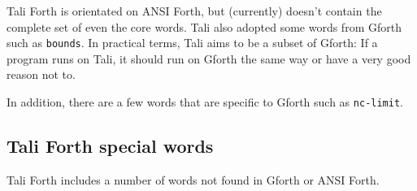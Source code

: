 Tali Forth is orientated on ANSI Forth, but (currently) doesn't contain the
complete set of even the core words. Tali also adopted some words from
Gforth such as \texttt{bounds}. In
practical terms, Tali aims to be a subset of Gforth: If a program runs on Tali,
it should run on Gforth the same way or have a very good reason not to. 

In addition, there are a few words that are specific to Gforth such as 
\texttt{nc-limit}. 


\subsection{Tali Forth special words}

Tali Forth includes a number of words not found in Gforth or ANSI Forth. 

